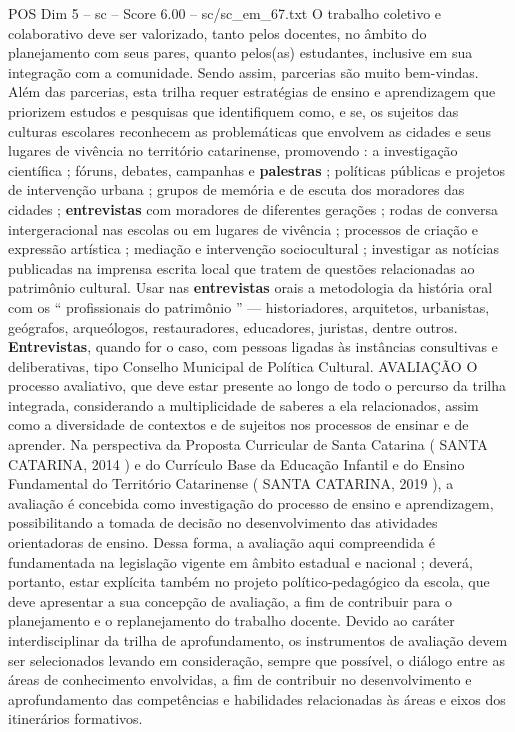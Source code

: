 \begin{textsample}{POS Dim 5 – sc – Score 6.00 – sc/sc\_em\_67.txt}
O trabalho coletivo e colaborativo deve ser valorizado, tanto pelos docentes, no âmbito do planejamento com seus pares, quanto pelos(as) estudantes, inclusive em sua integração com a comunidade.
Sendo assim, parcerias são muito bem-vindas.
Além das parcerias, esta trilha requer estratégias de ensino e aprendizagem que priorizem estudos e pesquisas que identifiquem como, e se, os sujeitos das culturas escolares reconhecem as problemáticas que envolvem as cidades e seus lugares de vivência no território catarinense, promovendo : a investigação científica ; fóruns, debates, campanhas e \textbf{palestras} ; políticas públicas e projetos de intervenção urbana ; grupos de memória e de escuta dos moradores das cidades ; \textbf{entrevistas} com moradores de diferentes gerações ; rodas de conversa intergeracional nas escolas ou em lugares de vivência ; processos de criação e expressão artística ; mediação e intervenção sociocultural ; investigar as notícias publicadas na imprensa escrita local que tratem de questões relacionadas ao patrimônio cultural.
Usar nas \textbf{entrevistas} orais a metodologia da história oral com os “ profissionais do patrimônio ” — historiadores, arquitetos, urbanistas, geógrafos, arqueólogos, restauradores, educadores, juristas, dentre outros. \textbf{Entrevistas}, quando for o caso, com pessoas ligadas às instâncias consultivas e deliberativas, tipo Conselho Municipal de Política Cultural.
AVALIAÇÃO O processo avaliativo, que deve estar presente ao longo de todo o percurso da trilha integrada, considerando a multiplicidade de saberes a ela relacionados, assim como a diversidade de contextos e de sujeitos nos processos de ensinar e de aprender.
Na perspectiva da Proposta Curricular de Santa Catarina ( SANTA CATARINA, 2014 ) e do Currículo Base da Educação Infantil e do Ensino Fundamental do Território Catarinense ( SANTA CATARINA, 2019 ), a avaliação é concebida como investigação do processo de ensino e aprendizagem, possibilitando a tomada de decisão no desenvolvimento das atividades orientadoras de ensino.
Dessa forma, a avaliação aqui compreendida é fundamentada na legislação vigente em âmbito estadual e nacional ; deverá, portanto, estar explícita também no projeto político-pedagógico da escola, que deve apresentar a sua concepção de avaliação, a fim de contribuir para o planejamento e o replanejamento do trabalho docente.
Devido ao caráter interdisciplinar da trilha de aprofundamento, os instrumentos de avaliação devem ser selecionados levando em consideração, sempre que possível, o diálogo entre as áreas de conhecimento envolvidas, a fim de contribuir no desenvolvimento e aprofundamento das competências e habilidades relacionadas às áreas e eixos dos itinerários formativos.

\end{textsample}
